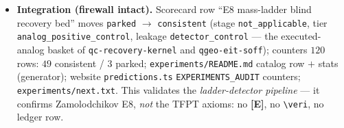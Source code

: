 \documentclass[11pt]{article}
\providecommand{\mE}{\textbf{[E]}}\providecommand{\mC}{\textbf{[C]}}
\begin{document}
\begin{itemize}[leftmargin=1.5em]
\item \textbf{Integration (firewall intact).} Scorecard row ``E8 mass-ladder blind recovery bed'' moves
\texttt{parked} $\to$ \texttt{consistent} (stage \texttt{not\_applicable}, tier
\texttt{analog\_positive\_control}, leakage \texttt{detector\_control} --- the executed-analog basket
of \texttt{qc-recovery-kernel} and \texttt{qgeo-eit-soff});
counters $120$ rows: $49$ consistent / $3$ parked; \texttt{experiments/README.md} catalog row $+$ stats
(generator); website \texttt{predictions.ts} \texttt{EXPERIMENTS\_AUDIT} counters;
\texttt{experiments/next.txt}. This validates the \emph{ladder-detector pipeline} --- it confirms
Zamolodchikov E8, \emph{not} the TFPT axioms: no \mE, no \texttt{\textbackslash veri}, no ledger row.
\end{itemize}
\end{document}
